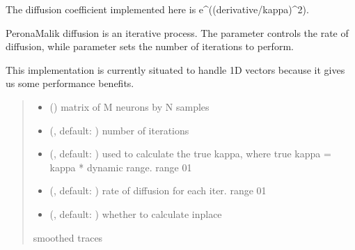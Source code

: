 \documentclass[letterpaper,10pt,english]{sphinxmanual}
\begin{document}
\begin{fulllineitems}
\sphinxAtStartPar
The diffusion coefficient implemented here is e\textasciicircum{}(\sphinxhyphen{}(derivative/kappa)\textasciicircum{}2).

\sphinxAtStartPar
Perona\sphinxhyphen{}Malik diffusion is an iterative process. The parameter  controls the rate of diffusion, while
parameter  sets the number of iterations to perform.

\sphinxAtStartPar
This implementation is currently situated to handle 1\sphinxhyphen{}D vectors because it gives us some performance benefits.
\begin{quote}\begin{description}
\begin{itemize}
\item {} 
\sphinxAtStartPar
{} () \textendash{} matrix of M neurons by N samples

\item {} 
\sphinxAtStartPar
{} (, default: ) \textendash{} number of iterations

\item {} 
\sphinxAtStartPar
{} (, default: ) \textendash{} used to calculate the true kappa, where true kappa = kappa * dynamic range. range 0\sphinxhyphen{}1

\item {} 
\sphinxAtStartPar
{} (, default: ) \textendash{} rate of diffusion for each iter. range 0\sphinxhyphen{}1

\item {} 
\sphinxAtStartPar
{} (, default: ) \textendash{} whether to calculate in\sphinxhyphen{}place

\end{itemize}

\sphinxAtStartPar
{}

\sphinxAtStartPar
smoothed traces

\end{description}\end{quote}

\end{fulllineitems}
\end{document}
